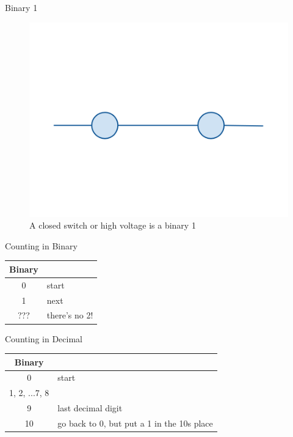 \documentclass[xcolor={dvipsnames}]{beamer}
\begin{document}
\begin{frame}{Binary 1}
	\begin{figure}	
		\includegraphics[trim =3cm 6cm 3cm 6cm, clip=true, width=1\textwidth]{close}
		\caption{A closed switch or high voltage is a binary 1}
	\end{figure}
\end{frame}

\begin{frame}{Counting in Binary}
	\begin{center}
	\begin{tabular}{c | l}
		Binary & \\
		\hline
		0 & start\\
		1 & next \\
		??? & there's no 2! \\
	\end{tabular}
	\end{center}
\end{frame}


\begin{frame}{Counting in Decimal}
	\begin{center}
	\begin{tabular}{c | l}
		Binary & \\
		\hline
		0 & start \\
		1, 2, ...7, 8 & \\
		9 & last decimal digit \\
		10 & go back to 0, but put a 1 in the 10s place
	\end{tabular}
	\end{center}
\end{frame}
\end{document}
